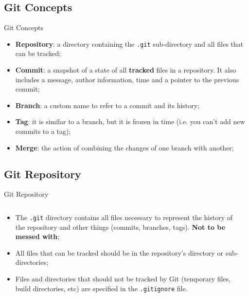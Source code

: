 \documentclass{beamer}
\begin{document}
\subsection{Git Concepts}
\begin{frame}{Git Concepts}
  \begin{itemize}
    \item \textbf{Repository}: a directory containing the \texttt{.git} sub-directory and all files that can be tracked;
    \item \textbf{Commit}: a snapshot of a state of all \textbf{tracked} files in a repository. It also includes a message, author information, time and a pointer to the previous commit;
    \item \textbf{Branch}: a custom name to refer to a commit and its history;
    \item \textbf{Tag}: it is similar to a branch, but it is frozen in time (i.e. you can't add new commits to a tag);
    \item \textbf{Merge}: the action of combining the changes of one branch with another;
  \end{itemize}
\end{frame}

\subsection{Git Repository}
\begin{frame}{Git Repository}
  \begin{columns}
    \begin{column}{0.6\textwidth}
      \begin{itemize}
        \item The \texttt{.git} directory contains all files necessary to represent the history of the repository and other things (commits, branches, tags). \textbf{Not to be messed with};
        \item All files that can be tracked should be in the repository's directory or sub-directories;
        \item Files and directories that should not be tracked by Git (temporary files, build directories, etc) are specified in the \texttt{.gitignore} file.
      \end{itemize}
    \end{column}
    \begin{column}{0.4\textwidth}
      \begin{center}
        
      \end{center}
    \end{column}
  \end{columns}
\end{frame}
\end{document}
